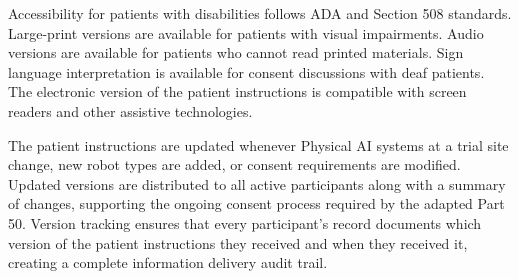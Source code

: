 Accessibility for patients with disabilities follows ADA and Section 508
standards. Large-print versions are available for patients with visual
impairments. Audio versions are available for patients who cannot read printed
materials. Sign language interpretation is available for consent discussions
with deaf patients. The electronic version of the patient instructions is
compatible with screen readers and other assistive technologies.

The patient instructions are updated whenever Physical AI systems at a trial
site change, new robot types are added, or consent requirements are modified.
Updated versions are distributed to all active participants along with a
summary of changes, supporting the ongoing consent process required by the
adapted Part 50. Version tracking ensures that every participant's record
documents which version of the patient instructions they received and when
they received it, creating a complete information delivery audit trail.
